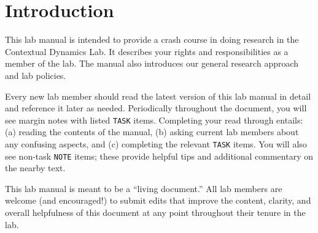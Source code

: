 \documentclass{tufte-book} %
\begin{document}




\newcommand{\director}{Jeremy}
\newcommand{\coordinator}{\director}
\newcommand{\meeting}{\href{https://context-lab.com/scheduler}{context-lab.com/scheduler}}

\cleardoublepage
\chapter{Introduction}\label{ch:intro} %
This lab manual is intended to provide a crash course in doing
research in the Contextual Dynamics Lab.  It describes your rights and
responsibilities as a member of the lab.  The manual also introduces
our general research approach and lab policies.


\noindent Every new lab member should read the latest version of this
lab manual in detail and reference it later as needed.  Periodically
throughout the document, you will see margin notes with listed
\texttt{TASK} items.  Completing your read through entails: (a)
reading the contents of the manual, (b) asking current lab members
about any confusing aspects, and (c) completing the relevant
\texttt{TASK} items.  You will also see non-task \texttt{NOTE} items;
these provide helpful tips and additional commentary on the nearby
text.

This lab manual is meant to be a ``living document.'' All lab members
are welcome (and encouraged!) to submit edits that improve the
content, clarity, and overall helpfulness of this document at any
point throughout their tenure in the lab.

\end{document}
